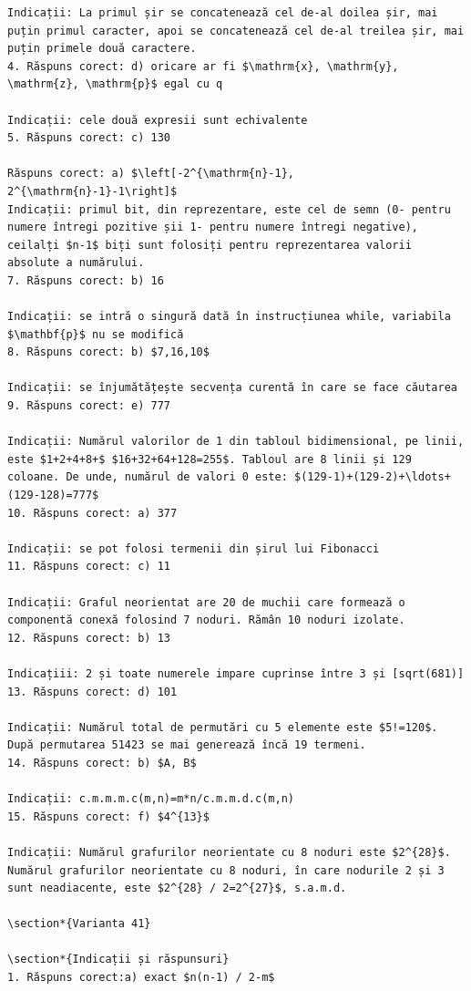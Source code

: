\documentclass[10pt]{article}
\begin{document}
\begin{verbatim}
Indicații: La primul șir se concatenează cel de-al doilea șir, mai puțin primul caracter, apoi se concatenează cel de-al treilea șir, mai puțin primele două caractere.
4. Răspuns corect: d) oricare ar fi $\mathrm{x}, \mathrm{y}, \mathrm{z}, \mathrm{p}$ egal cu q

Indicații: cele două expresii sunt echivalente
5. Răspuns corect: c) 130

Răspuns corect: a) $\left[-2^{\mathrm{n}-1}, 2^{\mathrm{n}-1}-1\right]$
Indicații: primul bit, din reprezentare, este cel de semn (0- pentru numere întregi pozitive șii 1- pentru numere întregi negative), ceilalți $n-1$ biți sunt folosiți pentru reprezentarea valorii absolute a numărului.
7. Răspuns corect: b) 16

Indicații: se intră o singură dată în instrucțiunea while, variabila $\mathbf{p}$ nu se modifică
8. Răspuns corect: b) $7,16,10$

Indicații: se înjumătățește secvența curentă în care se face căutarea
9. Răspuns corect: e) 777

Indicații: Numărul valorilor de 1 din tabloul bidimensional, pe linii, este $1+2+4+8+$ $16+32+64+128=255$. Tabloul are 8 linii și 129 coloane. De unde, numărul de valori 0 este: $(129-1)+(129-2)+\ldots+(129-128)=777$
10. Răspuns corect: a) 377

Indicații: se pot folosi termenii din șirul lui Fibonacci
11. Răspuns corect: c) 11

Indicații: Graful neorientat are 20 de muchii care formează o componentă conexă folosind 7 noduri. Rămân 10 noduri izolate.
12. Răspuns corect: b) 13

Indicațiii: 2 și toate numerele impare cuprinse între 3 și [sqrt(681)]
13. Răspuns corect: d) 101

Indicații: Numărul total de permutări cu 5 elemente este $5!=120$. După permutarea 51423 se mai generează încă 19 termeni.
14. Răspuns corect: b) $A, B$

Indicații: c.m.m.m.c(m,n)=m*n/c.m.m.d.c(m,n)
15. Răspuns corect: f) $4^{13}$

Indicații: Numărul grafurilor neorientate cu 8 noduri este $2^{28}$. Numărul grafurilor neorientate cu 8 noduri, în care nodurile 2 și 3 sunt neadiacente, este $2^{28} / 2=2^{27}$, s.a.m.d.

\section*{Varianta 41}

\section*{Indicații și răspunsuri}
1. Răspuns corect:a) exact $n(n-1) / 2-m$


\end{verbatim}
\end{document}
